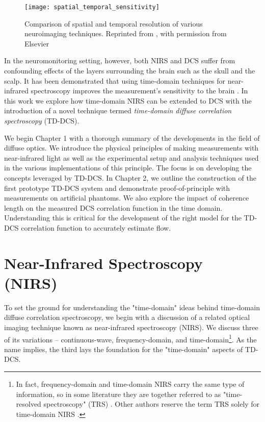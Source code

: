 \begin{figure}[tb]
    \centering
    \texttt{[image: spatial\_temporal\_sensitivity]}
    \caption{Comparison of spatial and temporal resolution of various neuroimaging techniques. Reprinted from \cite{Strangman2002}, with permission from Elsevier}
    \label{fig:time_space_resolution}
\end{figure}

In the neuromonitoring setting, however, both NIRS and DCS suffer from confounding effects of the layers surrounding the brain such as the skull and the scalp. It has been demonstrated that using time-domain techniques for near-infrared spectroscopy improves the measurement's sensitivity to the brain \cite{Selb2005}. In this work we explore how time-domain NIRS can be extended to DCS with the introduction of a novel technique termed \emph{time-domain diffuse correlation spectroscopy} (TD-DCS).

We begin Chapter 1 with a thorough summary of the developments in the field of diffuse optics. We introduce the physical principles of making measurements with near-infrared light as well as the experimental setup and analysis techniques used in the various implementations of this principle. The focus is on developing the concepts leveraged by TD-DCS. In Chapter 2, we outline the construction of the first prototype TD-DCS system and demonstrate proof-of-principle with measurements on artificial phantoms. We also explore the impact of coherence length on the measured DCS correlation function in the time domain. Understanding this is critical for the development of the right model for the TD-DCS correlation function to accurately estimate flow.

\section{Near-Infrared Spectroscopy (NIRS)} \label{sec:NIRS}

To set the ground for understanding the "time-domain" ideas behind time-domain diffuse correlation spectroscopy, we begin with a discussion of a related optical imaging technique known as near-infrared spectroscopy (NIRS). We discuss three of its variations -- continuous-wave, frequency-domain, and time-domain\footnote{In fact, frequency-domain and time-domain NIRS carry the same type of information, so in some literature they are together referred to as "time-resolved spectroscopy" (TRS) \cite{Scholkmann2013}. Other authors reserve the term TRS solely for time-domain NIRS \cite{Wolf2007}.}. As the name implies, the third lays the foundation for the "time-domain" aspects of TD-DCS.  


